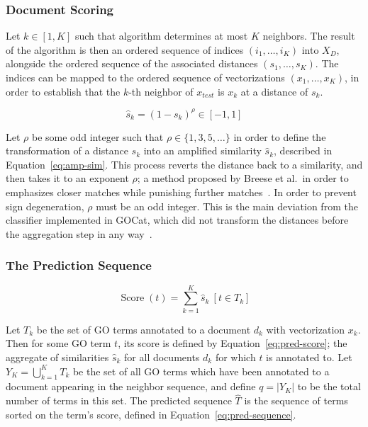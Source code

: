 \documentclass[11pt]{article}
\theoremstyle{plain}
\theoremstyle{definition}
\begin{document}
\subsubsection{Document Scoring}\label{sec:methods-scoring-document}

Let $k \in [1, K]$ such that algorithm determines at most $K$ neighbors. The result of the algorithm is then an ordered sequence of indices $(i_1, \dots, i_K)$ into $X_D$, alongside the ordered sequence of the associated distances $(s_1, \dots, s_K)$. The indices can be mapped to the ordered sequence of vectorizations $(x_1, \dots, x_K)$, in order to establish that the $k$-th neighbor of $x_{test}$ is $x_k$ at a distance of $s_k$.

\begin{equation}\label{eq:amp-sim}
    \hat{s}_k = {(1-s_k)}^\rho \in [-1, 1]
\end{equation}

Let $\rho$ be some odd integer such that $\rho \in \{1,3,5,\dots\}$ in order to define the transformation of a distance $s_k$ into an amplified similarity $\hat{s}_k$, described in Equation~\ref{eq:amp-sim}. This process reverts the distance back to a similarity, and then takes it to an exponent $\rho$; a method proposed by Breese et al.\ in order to emphasizes closer matches while punishing further matches~\cite{breese/1998/empirical}. In order to prevent sign degeneration, $\rho$ must be an odd integer. This is the main deviation from the classifier implemented in GOCat, which did not transform the distances before the aggregation step in any way~\cite{gobeill/2013/managing}.

\subsubsection{The Prediction Sequence}\label{sec:methods-scoring-sequence}

\begin{equation}
    \operatorname{Score}(t) = \sum_{k=1}^{K} \hat{s}_k\ [t \in T_k]
    \label{eq:pred-score}
\end{equation}

Let $T_k$ be the set of GO terms annotated to a document $d_k$ with vectorization $x_k$. Then for some GO term $t$, its score is defined by Equation~\ref{eq:pred-score}; the aggregate of similarities $\hat{s}_k$ for all documents $d_k$ for which $t$ is annotated to. Let $Y_K= \bigcup_{k=1}^K T_k$ be the set of all GO terms which have been annotated to a document appearing in the neighbor sequence, and define $q=|Y_K|$ to be the total number of terms in this set. The predicted sequence $\hat{T}$ is the sequence of terms sorted on the term's score, defined in Equation~\ref{eq:pred-sequence}.
\end{document}
